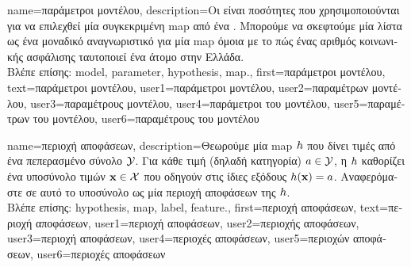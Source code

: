 {name={\foreignlanguage{greek}{παράμετροι μοντέλου}}, 
	description={\foreignlanguage{greek}{Οι}   
		\foreignlanguage{greek}{είναι ποσότητες που χρησιμοποιούνται για να επιλεχθεί μία συγκεκριμένη} \gls{map}  
		 \foreignlanguage{greek}{από ένα} . 
		\foreignlanguage{greek}{Μπορούμε να σκεφτούμε μία λίστα}   
		\foreignlanguage{greek}{ως ένα μοναδικό αναγνωριστικό για μία} \gls{map}  
		\foreignlanguage{greek}{όμοια με το πώς ένας αριθμός κοινωνικής ασφάλισης ταυτοποιεί ένα άτομο στην Ελλάδα.} \\
		\foreignlanguage{greek}{Βλέπε επίσης:} \gls{model}, \gls{parameter}, \gls{hypothesis}, \gls{map}.},
	first={\foreignlanguage{greek}{παράμετροι μοντέλου}},
	text={\foreignlanguage{greek}{παράμετροι μοντέλου}},
	user1={\foreignlanguage{greek}{παράμετροι μοντέλου}}, %
	user2={\foreignlanguage{greek}{παραμέτρων μοντέλου}}, %
	user3={\foreignlanguage{greek}{παραμέτρους μοντέλου}}, %
	user4={\foreignlanguage{greek}{παράμετροι του μοντέλου}}, %
	user5={\foreignlanguage{greek}{παραμέτρων του μοντέλου}}, %
	user6={\foreignlanguage{greek}{παραμέτρους του μοντέλου}} %
}

{name={\foreignlanguage{greek}{περιοχή αποφάσεων}}, 
	description={\foreignlanguage{greek}{Θεωρούμε μία} \gls{map} 
		 $h$ \foreignlanguage{greek}{που δίνει τιμές από ένα πεπερασμένο σύνολο $\mathcal{Y}$. 
		Για κάθε τιμή}  \foreignlanguage{greek}{(δηλαδή κατηγορία) $a \in \mathcal{Y}$, η}  $h$ 
		\foreignlanguage{greek}{καθορίζει ένα υποσύνολο τιμών}  ${\bf x} \in \mathcal{X}$ \foreignlanguage{greek}{που  
		οδηγούν στις ίδιες εξόδους $h({\bf x})=a$. Αναφερόμαστε σε αυτό το υποσύνολο ως μία περιοχή αποφάσεων  
		της}  $h$.\\
		\foreignlanguage{greek}{Βλέπε επίσης:} \gls{hypothesis}, \gls{map}, \gls{label}, \gls{feature}.},
	first={\foreignlanguage{greek}{περιοχή αποφάσεων}},
	text={\foreignlanguage{greek}{περιοχή αποφάσεων}},
	user1={\foreignlanguage{greek}{περιοχή αποφάσεων}}, %
	user2={\foreignlanguage{greek}{περιοχής αποφάσεων}}, %
	user3={\foreignlanguage{greek}{περιοχή αποφάσεων}}, %
	user4={\foreignlanguage{greek}{περιοχές αποφάσεων}}, %
	user5={\foreignlanguage{greek}{περιοχών αποφάσεων}}, %
	user6={\foreignlanguage{greek}{περιοχές αποφάσεων}} %
}

